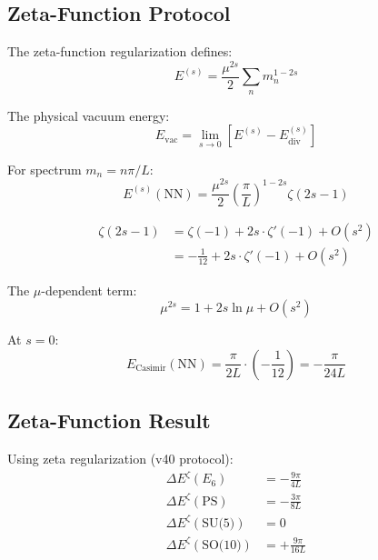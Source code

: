 \documentclass[11pt,a4paper]{article}
\begin{document}
\subsection{Zeta-Function Protocol}

The zeta-function regularization defines:
\begin{equation}
\label{eq:zeta-protocol-def}
E^{(s)} = \frac{\mu^{2s}}{2} \sum_n m_n^{1-2s}
\end{equation}

The physical vacuum energy:
\begin{equation}
\label{eq:zeta-physical}
E_{\text{vac}} = \lim_{s \to 0} \left[E^{(s)} - E_{\text{div}}^{(s)}\right]
\end{equation}

For spectrum $m_n = n\pi/L$:
\begin{equation}
\label{eq:zeta-nn-spectrum}
E^{(s)}(\text{NN}) = \frac{\mu^{2s}}{2} \left(\frac{\pi}{L}\right)^{1-2s} \zeta(2s-1)
\end{equation}

\begin{align}
\label{eq:zeta-exp-s0}
\zeta(2s-1) &= \zeta(-1) + 2s \cdot \zeta'(-1) + O(s^2) \\
\label{eq:zeta-m1-val}
&= -\frac{1}{12} + 2s \cdot \zeta'(-1) + O(s^2)
\end{align}

The $\mu$-dependent term:
\begin{equation}
\label{eq:mu-dep}
\mu^{2s} = 1 + 2s \ln\mu + O(s^2)
\end{equation}

At $s = 0$:
\begin{equation}
\label{eq:zeta-final-nn}
E_{\text{Casimir}}(\text{NN}) = \frac{\pi}{2L} \cdot \left(-\frac{1}{12}\right) = -\frac{\pi}{24L}
\end{equation}

\subsection{Zeta-Function Result}

Using zeta regularization (v40 protocol):
\begin{align}
\label{eq:zeta-e6}
\Delta E^{\zeta}(E_6) &= -\frac{9\pi}{4L} \\
\label{eq:zeta-ps}
\Delta E^{\zeta}(\text{PS}) &= -\frac{3\pi}{8L} \\
\label{eq:zeta-su5}
\Delta E^{\zeta}(\text{SU(5)}) &= 0 \\
\label{eq:zeta-so10}
\Delta E^{\zeta}(\text{SO(10)}) &= +\frac{9\pi}{16L}
\end{align}
\end{document}
